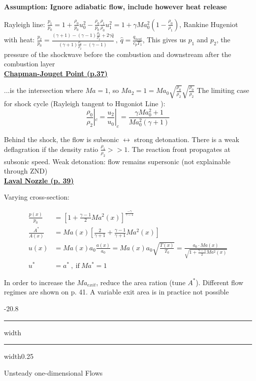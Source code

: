 \documentclass[8pt, landscape, fleqn]{scrartcl}
\makeatletter
\renewcommand{\section}{\@startsection{section}{1}{0mm}%
{-2\baselineskip}{0.8\baselineskip}%
{\hrule depth 0.2pt width\columnwidth\hrule depth1.5pt
width0.25\columnwidth\vspace*{1.2em}\Large\bfseries\rmfamily}}
\makeatother
\begin{document}
\begin{multicols*}{3}
\textbf{Assumption: Ignore adiabatic flow, include however heat release}

Rayleigh line: $\frac{p_1}{p_0} = 1 + \frac{\rho_0}{p_0} u_0^2 - \frac{\rho_0}{p_0}\frac{\rho_1}{\rho_0}u_1^2 = 1 + \gamma Ma_0^2 \left( 1 - \frac{\rho_0}{\rho_1}\right)$,
Rankine Hugeniot with heat: $\frac{p_2}{p_0} = \frac{(\gamma+1)-(\gamma-1)\frac{\rho_0}{\rho_2}+2\gamma \hat{q}}{(\gamma+1)\frac{\rho_0}{\rho_2}-(\gamma-1)}~,~ \hat{q} = \frac{q_{heat}}{c_p T_1}$, This gives us $p_1$ and $p_2$, the pressure of the shockwave before the combustion and downstream after the combustion layer \\

\underline{\textbf{Chapman-Jouget Point (p.37)}}

...is the intersection where $Ma=1$, so $Ma_2 = 1 = Ma_0 \sqrt{\frac{\rho_0}{\rho_2}} \sqrt{\frac{\rho_0}{\rho_2}}$
The limiting case for shock cycle (Rayleigh tangent to Hugoniot Line ): 
\begin{equation*}
    \frac{\rho_0}{\rho_2} |_c = \frac{u_2}{u_0} |_c = \frac{ \gamma Ma_0^2 + 1 }{Ma_0^2 (\gamma + 1)}
\end{equation*}

Behind the shock, the flow is subsonic $\leftrightarrow$ strong detonation. There is a weak deflagration if the density ratio $\frac{\rho_1}{\rho_2} >> 1$. The reaction front propagates at subsonic speed.  Weak detonation: flow remains supersonic (not explainable through ZND)\\

\underline{\textbf{Laval Nozzle (p. 39)}}

Varying cross-section:

\begin{align*}
    \frac{p(x)}{p_0} &= \left[ 1 + \frac{\gamma - 1}{2} Ma^2 (x) \right]^{\frac{-\gamma}{\gamma-1}} \\
    \frac{A^*}{A(x)} &= Ma(x) \left[ \frac{2}{\gamma+1} + \frac{\gamma-1}{\gamma+1}Ma^2(x)\right] \\
    u(x) &= Ma(x) a_0 \frac{a(x)}{a_0} = Ma(x) a_0 \sqrt{\frac{T(x)}{T_0}} = \frac{a_0 \cdot Ma(x)}{\sqrt{1 + \frac{\gamma-1}{2}Ma^2(x)}} \\
    u^* &= a^* ~,~ \text{if}~ Ma^* = 1
\end{align*}

In order to increase the $Ma_{exit}$, reduce the area ration (tune $A^*$). Different flow regimes are shown on p. 41. A variable exit area is in practice not possible

\section{Unsteady one-dimensional Flows}


\end{multicols*}
\end{document}
